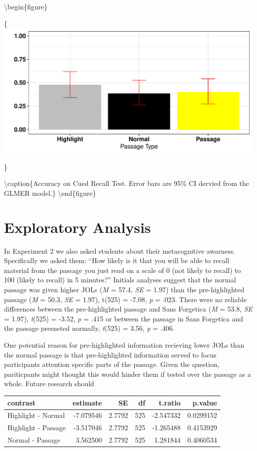 \documentclass[pdf]{apa6}
\begin{document}
\textbackslash{}begin\{figure\}

\{\centering \includegraphics{SF_Paper_files/figure-latex/unnamed-chunk-2-1}

\}

\textbackslash{}caption\{Accuracy on Cued Recall Test. Error bars are 95\% CI dervied from the GLMER model.\}\label{fig:unnamed-chunk-2}
\textbackslash{}end\{figure\}

\hypertarget{exploratory-analysis}{%
\section{Exploratory Analysis}\label{exploratory-analysis}}

In Experiment 2 we also asked students about their metacognitive awarness. Specifically we asked them: \enquote{How likely is it that you will be able to recall material from the passage you just read on a scale of 0 (not likely to recall) to 100 (likely to recall) in 5 minutes?} Initials analyses suggest that the normal passage was given higher JOLs (\emph{M} = 57.4, \emph{SE} = 1.97) than the pre-highlighted passage (\emph{M} = 50.3, \emph{SE} = 1.97), t(525) = -7.08, \emph{p} = .023. There were no reliable differences between the pre-highlighted passage and Sans Forgetica (\emph{M} = 53.8, \emph{SE} = 1.97), \emph{t}(525) = -3.52, \emph{p} = .415 or between the passage in Sans Forgetica and the passage presneted normally, \emph{t}(525) = 3.56, \emph{p} = .406.

One potential reason for pre-highlighted information recieving lower JOLs than the normal passage is that pre-highlighted information served to focus participants attention specific parts of the passage. Given the question, pariticpants might thought this would hinder them if tested over the passage as a whole. Future research should

\begin{tabular}{l|r|r|r|r|r}
\hline
contrast & estimate & SE & df & t.ratio & p.value\\
\hline
Highlight - Normal & -7.079546 & 2.7792 & 525 & -2.547332 & 0.0299152\\
\hline
Highlight - Passage & -3.517046 & 2.7792 & 525 & -1.265488 & 0.4153929\\
\hline
Normal - Passage & 3.562500 & 2.7792 & 525 & 1.281844 & 0.4060534\\
\hline
\end{tabular}
\end{document}
